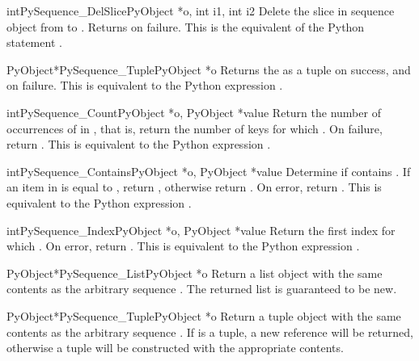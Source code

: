\begin{cfuncdesc}{int}{PySequence_DelSlice}{PyObject *o, int i1, int i2}
  Delete the slice in sequence object  from  to
  .  Returns  on failure.  This is the equivalent of
  the Python statement .
\end{cfuncdesc}

\begin{cfuncdesc}{PyObject*}{PySequence_Tuple}{PyObject *o}
  Returns the  as a tuple on success, and \NULL{} on failure.
  This is equivalent to the Python expression .
\end{cfuncdesc}

\begin{cfuncdesc}{int}{PySequence_Count}{PyObject *o, PyObject *value}
  Return the number of occurrences of  in , that is,
  return the number of keys for which .  On failure, return .  This is equivalent to
  the Python expression .
\end{cfuncdesc}

\begin{cfuncdesc}{int}{PySequence_Contains}{PyObject *o, PyObject *value}
  Determine if  contains .  If an item in  is
  equal to , return , otherwise return .
  On error, return .  This is equivalent to the Python
  expression .
\end{cfuncdesc}

\begin{cfuncdesc}{int}{PySequence_Index}{PyObject *o, PyObject *value}
  Return the first index  for which .  On error, return .    This is equivalent to
  the Python expression .
\end{cfuncdesc}

\begin{cfuncdesc}{PyObject*}{PySequence_List}{PyObject *o}
  Return a list object with the same contents as the arbitrary
  sequence .  The returned list is guaranteed to be new.
\end{cfuncdesc}

\begin{cfuncdesc}{PyObject*}{PySequence_Tuple}{PyObject *o}
  Return a tuple object with the same contents as the arbitrary
  sequence .  If  is a tuple, a new reference will be
  returned, otherwise a tuple will be constructed with the appropriate
  contents.
\end{cfuncdesc}

